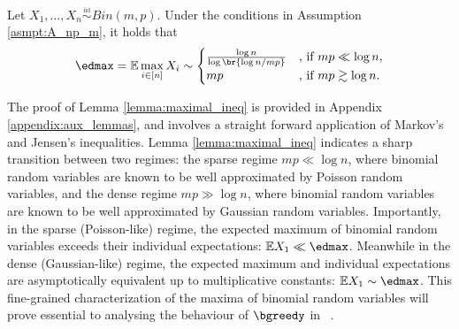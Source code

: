 \begin{lemma} \label{lemma:maximal_ineq}
Let $X_1, \ldots, X_n  \overset{\underset{\mathrm{iid}}{}}{\sim} Bin(m,p)$. Under the conditions in Assumption \ref{asmpt:A_np_m}, it holds that
\begin{align*}
\edmax = \mathbb{E}\max_{i \in [n]}X_i \sim \begin{cases}
        \frac{\log{n}}{\log\br{\log n / mp}} & \text{, if } mp \ll \log{n},\\
        mp & \text{, if } mp \gtrsim \log{n}.
    \end{cases}
\end{align*}
\end{lemma}
%
The proof of Lemma \ref{lemma:maximal_ineq} is provided in Appendix \ref{appendix:aux_lemmas}, and involves a straight forward application of Markov's and Jensen's inequalities. Lemma \ref{lemma:maximal_ineq} indicates a sharp transition between two regimes: the sparse regime $mp \ll \log{n}$, where binomial random variables are known to be well approximated by Poisson random variables, and the dense regime $mp \gg \log{n}$, where binomial random variables are known to be well approximated by Gaussian random variables. Importantly, in the sparse (Poisson-like) regime, the expected maximum of binomial random variables exceeds their individual expectations: $\mathbb{E} X_1 \ll \edmax$. Meanwhile in the dense (Gaussian-like) regime, the expected maximum and individual expectations are asymptotically equivalent up to multiplicative constants: $\mathbb{E} X_1 \sim \edmax$. This fine-grained characterization of the maxima of binomial random variables will prove essential to analysing the behaviour of $\bgreedy$ in ~. 
%
